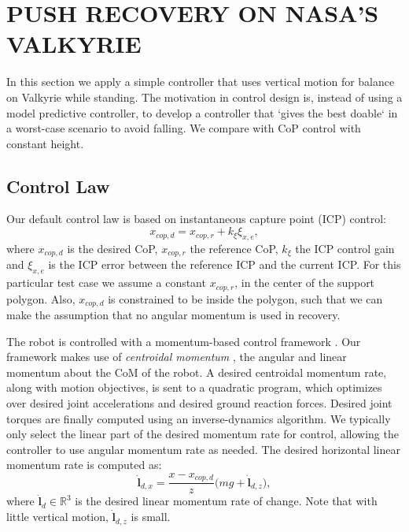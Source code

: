 \documentclass[letterpaper, 10 pt, conference]{ieeeconf}  %
\newcommand{\rcmpd}{x_{cop,d}}
\newcommand{\rcmpr}{x_{cop,r}}
\newcommand{\icpe}{\xi_{x,e}}
\begin{document}
\section{PUSH RECOVERY ON NASA'S VALKYRIE}\label{sec:valkyrie}
In this section we apply a simple controller that uses vertical motion for balance on Valkyrie while standing. The motivation in control design is, instead of using a model predictive controller, to develop a controller that `gives the best doable` in a worst-case scenario to avoid falling. We compare with CoP control with constant height.
\subsection{Control Law}
Our default control law is based on instantaneous capture point (ICP) \cite{koolen2012capturability} control:
\begin{equation}
	\rcmpd = \rcmpr + k_{\xi}\icpe,
\end{equation}
where $\rcmpd$ is the desired CoP, $\rcmpr$ the reference CoP, $k_{\xi}$ the ICP control gain and $\icpe$ is the ICP error between the reference ICP and the current ICP. For this particular test case we assume a constant $\rcmpr$, in the center of the support polygon. Also, $\rcmpd$ is constrained to be inside the polygon, such that we can make the assumption that no angular momentum is used in recovery.

The robot is controlled with a momentum-based control framework \cite{koolen2016design}. Our framework makes use of \textit{centroidal momentum} \cite{orin2013centroidal}, the angular and linear momentum about the CoM of the robot. 
A desired centroidal momentum rate, along with motion objectives, is sent to a quadratic program, which optimizes over desired joint accelerations and desired ground reaction forces. Desired joint torques are finally computed using an inverse-dynamics algorithm. We typically only select the linear part of the desired momentum rate for control, allowing the controller to use angular momentum rate as needed. The desired horizontal linear momentum rate is computed as:
\begin{equation}
	\dot{\mathbf{l}}_{d,x} = \frac{x-\rcmpd}{z}\big(mg + \dot{\mathbf{l}}_{d,z}\big),
\end{equation}
where $\dot{\mathbf{l}}_{d} \in \mathbb{R}^3$ is the desired linear momentum rate of change. Note that with little vertical motion, $ \dot{\mathbf{l}}_{d,z}$ is small.
\end{document}
